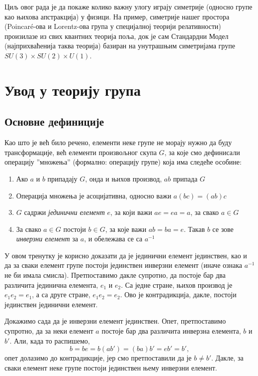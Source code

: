 \documentclass{report}
\theoremstyle{plain}
\theoremstyle{definition}
\begin{document}
Циљ овог рада је да покаже колико важну улогу играју симетрије (односно групе као њихова апстракција) у физици. На пример, симетрије нашег простора (Poincaré-ова и Lorentz-ова група у специјалној теорији релативности) произилазе из свих квантних теорија поља, док је сам Стандардни Модел (најприхваћенија таква теорија) базиран на унутрашњим симетријама групе $SU(3)\times SU(2)\times U(1)$.

\chapter{Увод у теорију група}
\section{Основне дефиниције}
Као што је већ било речено, елементи неке групе не морају нужно да буду трансформације, већ елементи произвољног скупа $G$, за које смо дефинисали операцију ''множења'' (формално: операцију групе) која има следеће особине:
\begin{enumerate}
  \item Ако $a$ и $b$ припадају $G$, онда и њихов производ, $ab$ припада $G$
  \item Операција множења је асоцијативна, односно важи $a(bc) = (ab)c$
  \item $G$ садржи \emph{јединични елемент} $e$, за који важи $ae = ea = a$, за свако $a\in G$
  \item За свако $a\in G$ постоји $b\in G$, за које важи $ab = ba = e$. Такав $b$ се зове \emph{инверзни елемент} за $a$, и обележава се са $a^{-1}$
\end{enumerate}
У овом тренутку је корисно доказати да је јединични елемент јединствен, као и да за сваки елемент групе постоји јединствен инверзни елемент (иначе ознака $a^{-1}$ не би имала смисла). Претпоставимо дакле супротно, да постоје бар два различита јединична елемента, $e_1$ и $e_2$. Са једне стране, њихов производ је $e_1 e_2 = e_1$, а са друге стране, $e_1 e_2 = e_2$. Ово је контрадикција, дакле, постоји јединствен јединични елемент.

Докажимо сада да је инверзни елемент јединствен. Опет, претпоставимо супротно, да за неки елемент $a$ постоје бар два различита инверзна елемента, $b$ и $b'$. Али, када то распишемо,
$$b = be = b(ab') = (ba)b' = eb' = b',$$
опет долазимо до контрадикције, јер смо претпоставили да је $b\neq b'$. Дакле, за сваки елемент неке групе постоји јединствен њему инверзни елемент.
\end{document}
